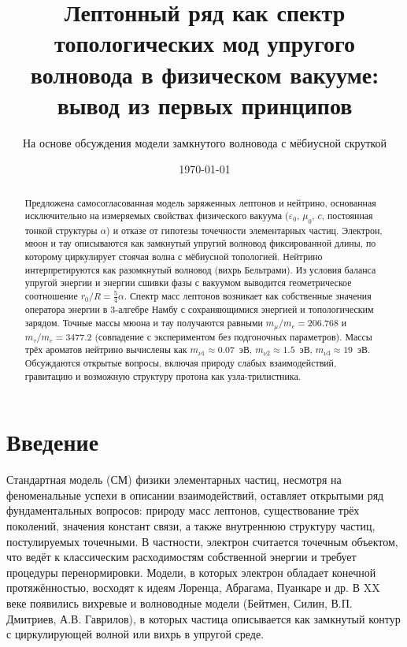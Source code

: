 \documentclass[12pt,a4paper]{article}
\title{Лептонный ряд как спектр топологических мод упругого волновода в физическом вакууме: вывод из первых принципов}
\author{На основе обсуждения модели замкнутого волновода с мёбиусной скруткой}
\date{\today}
\begin{document}
	
	\maketitle
	
	\begin{abstract}
		Предложена самосогласованная модель заряженных лептонов и нейтрино, основанная исключительно на измеряемых свойствах физического вакуума ($\varepsilon_0$, $\mu_0$, $c$, постоянная тонкой структуры $\alpha$) и отказе от гипотезы точечности элементарных частиц. Электрон, мюон и тау описываются как замкнутый упругий волновод фиксированной длины, по которому циркулирует стоячая волна с мёбиусной топологией. Нейтрино интерпретируются как разомкнутый волновод (вихрь Бельтрами). Из условия баланса упругой энергии и энергии сшивки фазы с вакуумом выводится геометрическое соотношение $r_0/R = \frac{5}{4}\alpha$. Спектр масс лептонов возникает как собственные значения оператора энергии в 3-алгебре Намбу с сохраняющимися энергией и топологическим зарядом. Точные массы мюона и тау получаются равными $m_\mu/m_e = 206.768$ и $m_\tau/m_e = 3477.2$ (совпадение с экспериментом без подгоночных параметров). Массы трёх ароматов нейтрино вычислены как $m_{\nu 1}\approx 0.07$~эВ, $m_{\nu 2}\approx 1.5$~эВ, $m_{\nu 3}\approx 19$~эВ. Обсуждаются открытые вопросы, включая природу слабых взаимодействий, гравитацию и возможную структуру протона как узла-трилистника.
	\end{abstract}
	
	\section{Введение}
	Стандартная модель (СМ) физики элементарных частиц, несмотря на феноменальные успехи в описании взаимодействий, оставляет открытыми ряд фундаментальных вопросов: природу масс лептонов, существование трёх поколений, значения констант связи, а также внутреннюю структуру частиц, постулируемых точечными. В частности, электрон считается точечным объектом, что ведёт к классическим расходимостям собственной энергии и требует процедуры перенормировки. Модели, в которых электрон обладает конечной протяжённостью, восходят к идеям Лоренца, Абрагама, Пуанкаре и др. В XX веке появились вихревые и волноводные модели (Бейтмен, Силин, В.П. Дмитриев, А.В. Гаврилов), в которых частица описывается как замкнутый контур с циркулирующей волной или вихрь в упругой среде.
	
\end{document}
